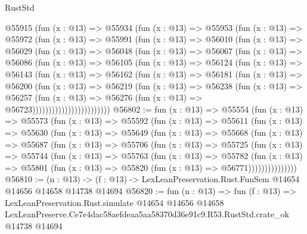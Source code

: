 \begin{lexlean}{RustStd}
\begin{coremodule}
          @55915
            (fun (x : @13) =>
            @55934
              (fun (x : @13) =>
              @55953
                (fun (x : @13) =>
                @55972
                  (fun (x : @13) =>
                  @55991
                    (fun (x : @13) =>
                    @56010
                      (fun (x : @13) =>
                      @56029
                        (fun (x : @13) =>
                        @56048
                          (fun (x : @13) =>
                          @56067
                            (fun (x : @13) =>
                            @56086
                              (fun (x : @13) =>
                              @56105
                                (fun (x : @13) =>
                                @56124
                                  (fun (x : @13) =>
                                  @56143
                                    (fun (x : @13) =>
                                    @56162
                                      (fun (x : @13) =>
                                      @56181
                                        (fun (x : @13) =>
                                        @56200
                                          (fun (x : @13) =>
                                          @56219
                                            (fun (x : @13) =>
                                            @56238
                                              (fun (x : @13) =>
                                              @56257
                                                (fun (x : @13) =>
                                                @56276
                                                  (fun (x : @13) => @56723))))))))))))))))))))))))
@56802 := fun (x : @13) =>
  @55554
    (fun (x : @13) =>
    @55573
      (fun (x : @13) =>
      @55592
        (fun (x : @13) =>
        @55611
          (fun (x : @13) =>
          @55630
            (fun (x : @13) =>
            @55649
              (fun (x : @13) =>
              @55668
                (fun (x : @13) =>
                @55687
                  (fun (x : @13) =>
                  @55706
                    (fun (x : @13) =>
                    @55725
                      (fun (x : @13) =>
                      @55744
                        (fun (x : @13) =>
                        @55763
                          (fun (x : @13) =>
                          @55782
                            (fun (x : @13) =>
                            @55801 (fun (x : @13) => @55820 (fun (x : @13) => @56771)))))))))))))))
@56810 := (n : @13) ->
  (f : @13) -> LexLeanPreservation.Rust.FunSem @14654 @14656 @14658 @14738 @14694
@56820 := fun (n : @13) =>
  fun (f : @13) =>
  LexLeanPreservation.Rust.simulate
    @14654
    @14656
    @14658
    LexLeanPreserve.Ce7e4dac58aefdeaa5aa58370d36e91c9.R53.RustStd.crate_ok
    @14738
    @14694
\end{coremodule}
\end{lexlean}
